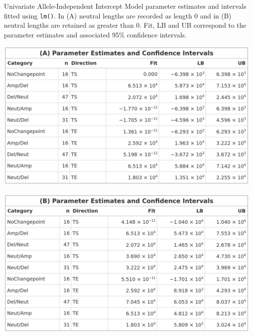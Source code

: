 \begin{table}[!htb]
    \caption[Univariate Allele-Independent Intercept Model parameter estimates and intervals fitted using \texttt{lm()}.]{Univariate Allele-Independent Intercept Model parameter estimates and intervals fitted using \texttt{lm()}. In (A) neutral lengths are recorded as length 0 and in (B) neutral lengths are retained as greater than 0. Fit, LB and UB correspond to the parameter estimates and associated 95\% confidence intervals. }
    \label{tbl:lm_uni_1_pred}
     \begin{subtable}[t]{.49\textwidth}
      \centering
      \includegraphics[width = 1\textwidth]{../tables/Chapter_5/Univariate_lm_7_AI_Pred.png}
    \end{subtable}%
    \hspace{0.5cm}
     \begin{subtable}[t]{.49\textwidth}
      \centering
         \includegraphics[width = 1\textwidth]{../tables/Chapter_5/Univariate_lm_7_Neut_AI_Pred.png}
    \end{subtable} 
\end{table}

